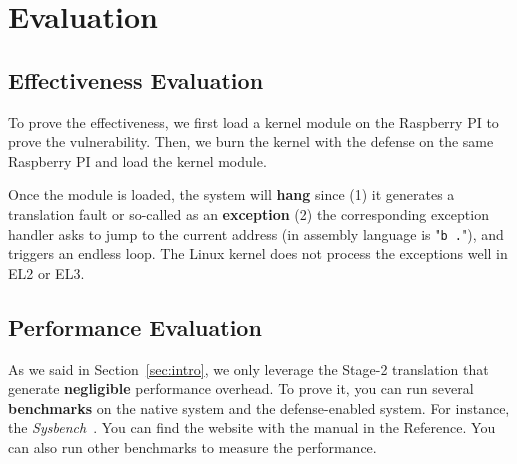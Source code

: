 \section{Evaluation}
\label{sec:evaluation}

\subsection{Effectiveness Evaluation}

To prove the effectiveness, we first load a \TheName{} kernel module on the Raspberry PI to prove the vulnerability.
Then, we burn the kernel with the defense on the same Raspberry PI and load the \TheName{} kernel module.

Once the module is loaded, the system will \textbf{hang} since (1) it generates a translation fault or so-called as an \textbf{exception} 
(2) the corresponding exception handler asks to jump to the current address (in assembly language is "\texttt{b .}"), and triggers an endless loop.
The Linux kernel does not process the exceptions well in EL2 or EL3.


\subsection{Performance Evaluation}

As we said in Section~\ref{sec:intro}, we only leverage the Stage-2 translation that generate \textbf{negligible} performance overhead. To prove it, you can run several \textbf{benchmarks} on the native system and the defense-enabled system. For instance, the \textit{Sysbench}~\cite{sysbench}. You can find the website with the manual in the Reference. You can also run other benchmarks to measure the performance.